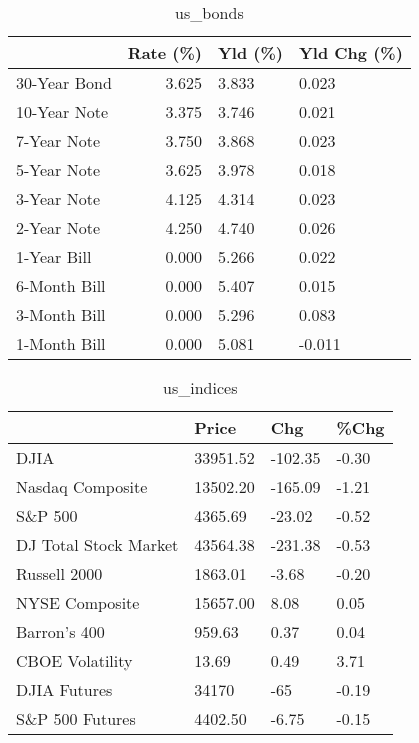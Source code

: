 \documentclass{article}%
\begin{document}
%


\begin{table}[htbp]%
\caption{us\_bonds}%
\centering%
\begin{adjustbox}{width=1\textwidth}%
\begin{tabular}{lrll}
\toprule
             &  Rate (\%) & Yld (\%) & Yld Chg (\%) \\
\midrule
30-Year Bond &     3.625 &   3.833 &       0.023 \\
10-Year Note &     3.375 &   3.746 &       0.021 \\
 7-Year Note &     3.750 &   3.868 &       0.023 \\
 5-Year Note &     3.625 &   3.978 &       0.018 \\
 3-Year Note &     4.125 &   4.314 &       0.023 \\
 2-Year Note &     4.250 &   4.740 &       0.026 \\
 1-Year Bill &     0.000 &   5.266 &       0.022 \\
6-Month Bill &     0.000 &   5.407 &       0.015 \\
3-Month Bill &     0.000 &   5.296 &       0.083 \\
1-Month Bill &     0.000 &   5.081 &      -0.011 \\
\bottomrule
\end{tabular}
%
\end{adjustbox}%
\end{table}

%


\begin{table}[htbp]%
\caption{us\_indices}%
\centering%
\begin{adjustbox}{width=1\textwidth}%
\begin{tabular}{llll}
\toprule
                      &    Price &     Chg &  \%Chg \\
\midrule
                 DJIA & 33951.52 & -102.35 & -0.30 \\
     Nasdaq Composite & 13502.20 & -165.09 & -1.21 \\
              S\&P 500 &  4365.69 &  -23.02 & -0.52 \\
DJ Total Stock Market & 43564.38 & -231.38 & -0.53 \\
         Russell 2000 &  1863.01 &   -3.68 & -0.20 \\
       NYSE Composite & 15657.00 &    8.08 &  0.05 \\
         Barron's 400 &   959.63 &    0.37 &  0.04 \\
      CBOE Volatility &    13.69 &    0.49 &  3.71 \\
         DJIA Futures &    34170 &     -65 & -0.19 \\
      S\&P 500 Futures &  4402.50 &   -6.75 & -0.15 \\
\bottomrule
\end{tabular}
%
\end{adjustbox}%
\end{table}
\end{document}
